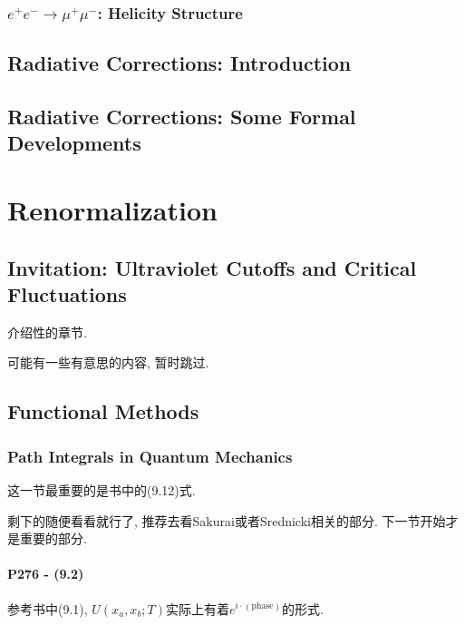 \documentclass[10pt,b5paper,openany]{book}
\begin{document}
\section{\texorpdfstring{$e^+e^- \rightarrow \mu^+\mu^-$}:: Helicity Structure}




\clearpage

\chapter{Radiative Corrections: Introduction}

\chapter{Radiative Corrections: Some Formal Developments}

\clearpage

\part{Renormalization}

\clearpage

\chapter{Invitation: Ultraviolet Cutoffs and Critical Fluctuations}

介绍性的章节. 

可能有一些有意思的内容, 暂时跳过. 

\clearpage

\chapter{Functional Methods}

\section{Path Integrals in Quantum Mechanics}

这一节最重要的是书中的(9.12)式. 

剩下的随便看看就行了, 推荐去看Sakurai或者Srednicki相关的部分. 下一节开始才是重要的部分. 

\subsection{P276 - (9.2)}

参考书中(9.1), $U(x_a, x_b; T)$实际上有着$e^{i \cdot (\text{phase})}$的形式. 
\end{document}
